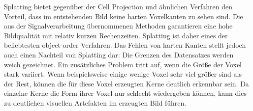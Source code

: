 \documentclass[a4paper,fontsize=12pt,toc=bib,halfparskip]{scrartcl}
\begin{document}
Splatting bietet gegen\"uber der Cell Projection und \"ahnlichen Verfahren den Vorteil, dass im entstehenden Bild keine harten Voxelkanten zu sehen sind. Die aus der Signalverarbeitung \"ubernommenen Methoden garantieren eine hohe Bildqualit\"at mit relativ kurzen Rechenzeiten. Splatting ist daher eines der beliebtesten object-order Verfahren.
Das Fehlen von harten Kanten stellt jedoch auch einen Nachteil von Splatting dar: Die Grenzen des Datensatzes werden weich gezeichnet. Ein zus\"atzliches Problem tritt auf, wenn die Gr\"o{\ss}e der Voxel stark variiert. Wenn beispielsweise einige wenige Voxel sehr viel gr\"o{\ss}er sind als der Rest, k\"onnen die f\"ur diese Voxel erzeugten Kerne deutlich erkennbar sein. Da einzelne Kerne die Form ihrer Voxel nur schlecht wiedergeben k\"onnen, kann dies zu deutlichen visuellen Artefakten im erzeugten Bild f\"uhren.
\end{document}
